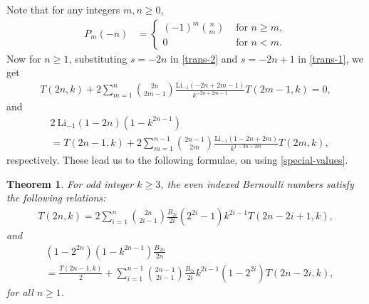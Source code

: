 \documentclass[12pt]{amsart}
\newtheorem{thm}{Theorem}
\begin{document}
Note that for any integers $m,n\geq 0$,
\begin{align*}
 P_m(-n)&=\left\{
    \begin{array}{ll}
    (-1)^m \binom{n}{m}  &  \text{ for } n \ge m,\\
    0 & \text{ for } n<m.
    \end{array}
\right.
\end{align*}
Now for $n\geq 1$, substituting $s=-2n$  in \eqref{trans-2} and $s=-2n+1$ in \eqref{trans-1}, we get
\begin{align}\label{special-trans-formula}
T(2n,k)+2\sum_{m=1}^{n}\binom{2n}{2m-1}\frac{\mathrm{Li}_{-1}(-2n+2m-1)}{k^{-2n+2m-1}}T(2m-1,k)=0,
\end{align}
and 
\begin{equation}\label{trans-formula-2}
\begin{split}
&2 \ \mathrm{Li}_{-1}(1-2n)(1-k^{2n-1})\\
&=T(2n-1,k)+2\sum_{m=1}^{n-1}\binom{2n-1}{2m}\frac{\mathrm{Li}_{-1}(1-2n+2m)}{k^{{1-2n+2m}}}T(2m,k),
\end{split}
\end{equation}
respectively. These lead us to the following formulae, on using \eqref{special-values}.
\begin{thm}\label{Bernoulli-recurrence-thm} 
For odd integer $k\geq 3$, the even indexed Bernoulli numbers satisfy the following relations:
\begin{align}\label{Bernoulli-recurrence}
T(2n,k)=2\sum_{i=1}^{n}\binom{2n}{2i-1}\frac{B_{2i}}{2i}(2^{2i}-1)k^{2i-1}T(2n-2i+1,k),
\end{align}
and
\begin{equation}\label{Bernoulli-recurrence-2}
\begin{split}
&(1-2^{2n})(1-k^{2n-1})\frac{B_{2n}}{2n}\\
&=\frac{T({2n-1},k)}{2}+\sum_{i=1}^{n-1}\binom{2n-1}{2i-1}\frac{B_{2i}}{2i} k^{2i-1} (1-2^{2i}) T(2n-2i,k),
\end{split}
\end{equation}
for all $n\geq 1$.
\end{thm}
\end{document}
